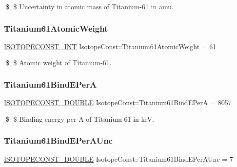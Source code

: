 \$ \$ Uncertainty in atomic mass of Titanium-\/61 in amu. \mbox{\label{group___isotope_const-_titanium-_ti61_gac57e76afb3949e34e59e985d207a4a86}} 
\subsubsection{\texorpdfstring{Titanium61\+Atomic\+Weight}{Titanium61AtomicWeight}}
{\footnotesize\ttfamily \mbox{\hyperlink{group___isotope_const-_macros_ga5f18360b3e99483a35c32d789e62621c}{I\+S\+O\+T\+O\+P\+E\+C\+O\+N\+S\+T\+\_\+\+I\+NT}} Isotope\+Const\+::\+Titanium61\+Atomic\+Weight = 61}

\$ \$ Atomic weight of Titanium-\/61. \mbox{\label{group___isotope_const-_titanium-_ti61_gae0fe9b089fbc9d7bd6e26def02c3d5e3}} 
\subsubsection{\texorpdfstring{Titanium61\+Bind\+E\+PerA}{Titanium61BindEPerA}}
{\footnotesize\ttfamily \mbox{\hyperlink{group___isotope_const-_macros_ga8f45a7272ce02c0b4c65c44636ed719a}{I\+S\+O\+T\+O\+P\+E\+C\+O\+N\+S\+T\+\_\+\+D\+O\+U\+B\+LE}} Isotope\+Const\+::\+Titanium61\+Bind\+E\+PerA = 8057}

\$ \$ Binding energy per A of Titanium-\/61 in keV. \mbox{\label{group___isotope_const-_titanium-_ti61_ga32932161711de5f9cb922b3bf21b4e62}} 
\subsubsection{\texorpdfstring{Titanium61\+Bind\+E\+Per\+A\+Unc}{Titanium61BindEPerAUnc}}
{\footnotesize\ttfamily \mbox{\hyperlink{group___isotope_const-_macros_ga8f45a7272ce02c0b4c65c44636ed719a}{I\+S\+O\+T\+O\+P\+E\+C\+O\+N\+S\+T\+\_\+\+D\+O\+U\+B\+LE}} Isotope\+Const\+::\+Titanium61\+Bind\+E\+Per\+A\+Unc = 7}

